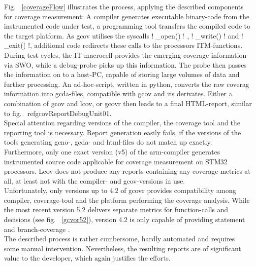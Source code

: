 \documentclass[master,english,smartquotes,apa]{hgbthesis}
\begin{document}
			Fig. ~\ref{coverageFlow} illustrates the process, applying the described components for coverage measurement: A compiler generates executable binary-code from the instrumented code under test, a programming tool transfers the compiled code to the target platform. As gcov utilises the syscalls \lstC ! _open() ! , \lstC ! _write() ! and  \lstC ! _exit() !, additional code redirects these calls to the processors ITM-functions. During test-cycles, the IT-macrocell provides the emerging coverage information via SWO, while a debug-probe picks up this information. The probe then passes the information on to a host-PC, capable of storing large volumes of data and further processing. An ad-hoc-script, written in python, converts the raw coverag information into gcda-files, compatible with gcov and its derivates. Either a combination of gcov and lcov, or gcovr then leads to a final HTML-report, similar to fig. ~ref{gcovReportDebugUnit01}. \\
			Special attention regarding versions of the compiler, the coverage tool and the reporting tool is necessary. Report generation easily fails, if the versions of the tools generating gcno-, gcda- and html-files do not match up exactly. Furthermore, only one exact version (v5) of the arm-compiler generates instrumented source code applicable for coverage measurement on STM32 processors. Lcov does not produce any reports containing any coverage metrics at all, at least not with the compiler- and gcov-versions in use. \\
			Unfortunately, only versions up to 4.2 of gcovr provides compatibility among compiler, coverage-tool and the platform performing the coverage analysis. While the most recent version 5.2 delivers separate metrics for function-calls and decisions (see fig. ~\ref{gcvor52}), version 4.2 is only capable of providing statement and branch-coverage\cite{gcovr} . \\

			The described process is rather cumbersome, hardly automated and requires some manual intervention. Nevertheless, the resulting reports are of significant value to the developer, which again justifies the efforts. 

		\section{}
			\subsection{}
\end{document}
